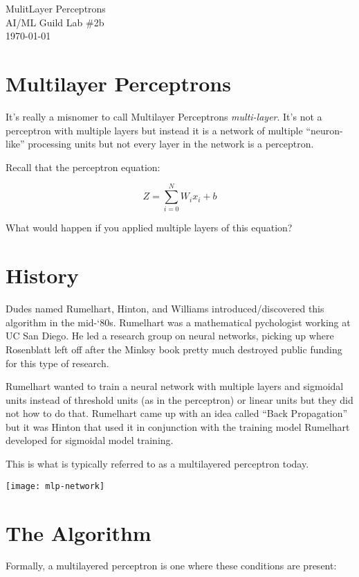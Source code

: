 \documentclass[letterpaper,12pt]{article}
\begin{document}
\begin{flushleft}
    MulitLayer Perceptrons\\
    AI/ML Guild Lab \#2b\\
    \today \\
\end{flushleft}

\section{Multilayer Perceptrons}

It's really a misnomer to call Multilayer Perceptrons \emph{multi-layer}. It's
not a perceptron with multiple layers but instead it is a network of multiple
``neuron-like'' processing units but not every layer in the network is a
perceptron.

Recall that the perceptron equation:

\[
    Z = \sum_{i=0}^{N} W_i x_i + b
\]

What would happen if you applied multiple layers of this equation?

\section{History}

Dudes named Rumelhart, Hinton, and Williams introduced/discovered this algorithm
in the mid-‘80s. Rumelhart was a mathematical pychologist working at UC San
Diego. He led a research group on neural networks, picking up where Rosenblatt
left off after the Minksy book pretty much destroyed public funding for this
type of research.

Rumelhart wanted to train a neural network with multiple
layers and sigmoidal units instead of threshold units (as in the perceptron)
or linear units but they did not how to do that. Rumelhart came up with an idea
called ``Back Propagation'' but it was Hinton that used it in conjunction with
the training model Rumelhart developed for sigmoidal model training.

This is what is typically referred to as a multilayered perceptron today.

\texttt{[image: mlp-network]}

\section{The Algorithm}

Formally, a multilayered perceptron is one where these conditions are present:
\end{document}
